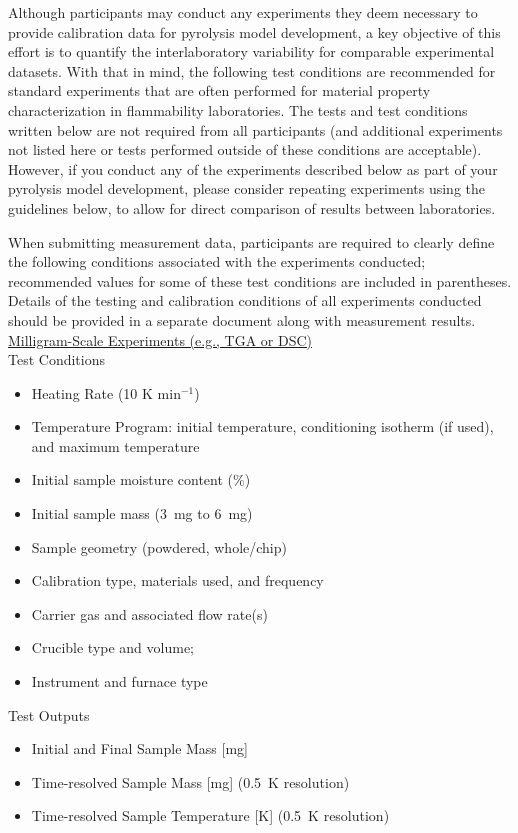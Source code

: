 \documentclass[12pt]{article}
\begin{document}
Although participants may conduct any experiments they deem necessary to provide calibration data for pyrolysis model development, a key objective of this effort is to quantify the interlaboratory variability for comparable experimental datasets. With that in mind, the following test conditions are recommended for standard experiments that are often performed for material property characterization in flammability laboratories. The tests and test conditions written below are not required from all participants (and additional experiments not listed here or tests performed outside of these conditions are acceptable). However, if you conduct any of the experiments described below as part of your pyrolysis model development, please consider repeating experiments using the guidelines below, to allow for direct comparison of results between laboratories.

When submitting measurement data, participants are required to clearly define the following conditions associated with the experiments conducted; recommended values for some of these test conditions are included in parentheses. Details of the testing and calibration conditions of all experiments conducted should be provided in a separate document along with measurement results.\\

\noindent \underline{Milligram-Scale Experiments (e.g., TGA or DSC)}\\

\noindent Test Conditions
\begin{itemize}[noitemsep]
\item Heating Rate (10 K min$^{-1}$)
\item Temperature Program: initial temperature, conditioning isotherm (if used), and maximum temperature
\item Initial sample moisture content (\%)
\item Initial sample mass (3~mg to 6~mg)
\item Sample geometry (powdered, whole/chip)
\item Calibration type, materials used, and frequency
\item Carrier gas and associated flow rate(s)
\item Crucible type and volume; 
\item Instrument and furnace type
\end{itemize}  

\noindent Test Outputs
\begin{itemize}[noitemsep]
\item Initial and Final Sample Mass [mg]
\item Time-resolved Sample Mass [mg] (0.5~K resolution)
\item Time-resolved Sample Temperature [K] (0.5~K resolution)
\end{itemize}
\end{document}
